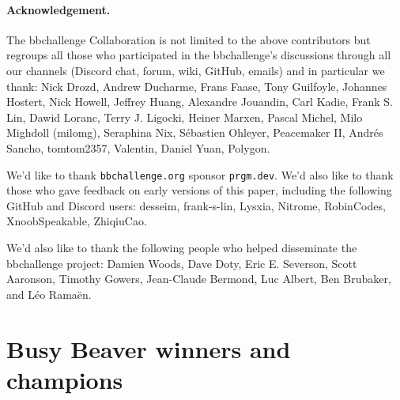\documentclass[a4paper,british]{article}
\theoremstyle{definition} %
\numberwithin{equation}{section}
\theoremstyle{definition} %
\begin{document}
\paragraph{Acknowledgement.} The bbchallenge Collaboration is not limited to the above contributors but regroups all those who participated in the bbchallenge's discussions through all our channels (Discord chat, forum, wiki, GitHub, emails) and in particular we thank:  Nick Drozd, Andrew Ducharme, Frans Faase, Tony Guilfoyle, Johannes Hostert, Nick Howell, Jeffrey Huang, Alexandre Jouandin, Carl Kadie, Frank S. Lin, Dawid Loranc, Terry J. Ligocki, Heiner Marxen, Pascal Michel, Milo Mighdoll (milomg), Seraphina Nix, Sébastien Ohleyer, Peacemaker II, Andrés Sancho, tomtom2357, Valentin, Daniel Yuan, Polygon.


We'd like to thank \texttt{bbchallenge.org} sponsor \texttt{prgm.dev}. We'd also like to thank those who gave feedback on early versions of this paper, including the following GitHub and Discord users: desseim, frank-s-lin, Lysxia, Nitrome, RobinCodes, XnoobSpeakable, ZhiqiuCao.

We'd also like to thank the following people who helped disseminate the bbchallenge project: Damien Woods, Dave Doty, Eric E. Severson, Scott Aaronson, Timothy Gowers, Jean-Claude Bermond, Luc Albert, Ben Brubaker, and Léo Ramaën.

\begingroup
\renewcommand\thefootnote{$\ast$}
\endgroup

\newpage

\vspace*{-5em}
\section{Busy Beaver winners and champions}\label{app:lowerbounds}
\end{document}
